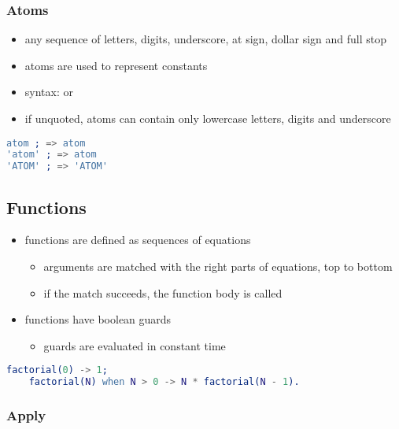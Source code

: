 \documentclass[a4paper,landscape,10pt]{article}
\begin{document}
\begin{multicols*}{2}
  \subsubsection{Atoms}
  \label{sec:erlang-atoms}

  \begin{itemize}
    \item any sequence of letters, digits, underscore, at sign, dollar sign and full stop
    \item atoms are used to represent constants
    \item syntax:  or 
    \item if unquoted, atoms can contain only lowercase letters, digits and underscore
  \end{itemize}

  \begin{lstlisting}[language=Erlang]
atom ; => atom
'atom' ; => atom
'ATOM' ; => 'ATOM'
\end{lstlisting}

  \breakcolumn

  \subsection{Functions}

  \begin{itemize}
    \item functions are defined as sequences of equations
          \begin{itemize}
            \item arguments are matched with the right parts of equations, top to bottom
            \item if the match succeeds, the function body is called
          \end{itemize}
    \item functions have boolean guards 
          \begin{itemize}
            \item guards are evaluated in constant time
          \end{itemize}
  \end{itemize}

  \begin{lstlisting}[language=Erlang]
    factorial(0) -> 1;
    factorial(N) when N > 0 -> N * factorial(N - 1).
  \end{lstlisting}

  \subsubsection{Apply}


\end{multicols*}
\end{document}
